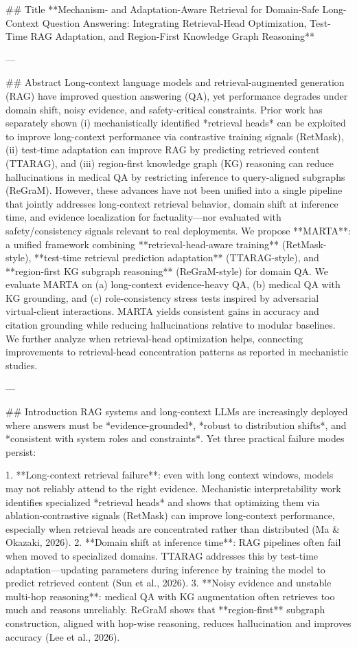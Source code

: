 ## Title  
**Mechanism- and Adaptation-Aware Retrieval for Domain-Safe Long-Context Question Answering: Integrating Retrieval-Head Optimization, Test-Time RAG Adaptation, and Region-First Knowledge Graph Reasoning**

---

## Abstract  
Long-context language models and retrieval-augmented generation (RAG) have improved question answering (QA), yet performance degrades under domain shift, noisy evidence, and safety-critical constraints. Prior work has separately shown (i) mechanistically identified *retrieval heads* can be exploited to improve long-context performance via contrastive training signals (RetMask), (ii) test-time adaptation can improve RAG by predicting retrieved content (TTARAG), and (iii) region-first knowledge graph (KG) reasoning can reduce hallucinations in medical QA by restricting inference to query-aligned subgraphs (ReGraM). However, these advances have not been unified into a single pipeline that jointly addresses long-context retrieval behavior, domain shift at inference time, and evidence localization for factuality—nor evaluated with safety/consistency signals relevant to real deployments.  
We propose **MARTA**: a unified framework combining **retrieval-head-aware training** (RetMask-style), **test-time retrieval prediction adaptation** (TTARAG-style), and **region-first KG subgraph reasoning** (ReGraM-style) for domain QA. We evaluate MARTA on (a) long-context evidence-heavy QA, (b) medical QA with KG grounding, and (c) role-consistency stress tests inspired by adversarial virtual-client interactions. MARTA yields consistent gains in accuracy and citation grounding while reducing hallucinations relative to modular baselines. We further analyze when retrieval-head optimization helps, connecting improvements to retrieval-head concentration patterns as reported in mechanistic studies.

---

## Introduction  
RAG systems and long-context LLMs are increasingly deployed where answers must be *evidence-grounded*, *robust to distribution shifts*, and *consistent with system roles and constraints*. Yet three practical failure modes persist:

1. **Long-context retrieval failure**: even with long context windows, models may not reliably attend to the right evidence. Mechanistic interpretability work identifies specialized *retrieval heads* and shows that optimizing them via ablation-contrastive signals (RetMask) can improve long-context performance, especially when retrieval heads are concentrated rather than distributed (Ma & Okazaki, 2026).  
2. **Domain shift at inference time**: RAG pipelines often fail when moved to specialized domains. TTARAG addresses this by test-time adaptation—updating parameters during inference by training the model to predict retrieved content (Sun et al., 2026).  
3. **Noisy evidence and unstable multi-hop reasoning**: medical QA with KG augmentation often retrieves too much and reasons unreliably. ReGraM shows that **region-first** subgraph construction, aligned with hop-wise reasoning, reduces hallucination and improves accuracy (Lee et al., 2026).

